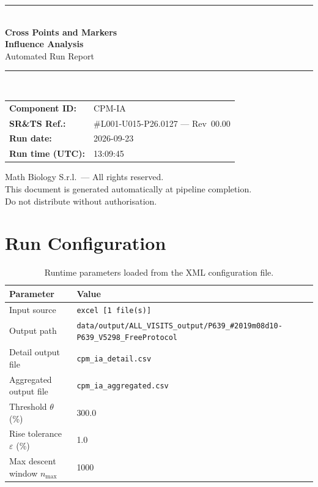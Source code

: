 \documentclass[a4paper,11pt]{article}
\begin{document}
\begin{titlepage}
\begin{center}
  \vspace*{1.8cm}
  {\color{dmaaccent}\rule{\linewidth}{1.5pt}}\\[0.6cm]
  {\LARGE\bfseries\color{dmaaccent}
    Cross Points and Markers\\[0.25cm]
    Influence Analysis}\\[0.4cm]
  {\Large Automated Run Report}\\[0.3cm]
  {\color{dmaaccent}\rule{\linewidth}{1.5pt}}\\[2cm]

  \begin{tabular}{ll}
    \textbf{Component ID:}   & CPM-IA \\[0.3cm]
    \textbf{SR\&TS Ref.:}    & \#L001-U015-P26.0127 --- Rev~00.00 \\[0.3cm]
    \textbf{Run date:}       & 2026-09-23 \\[0.3cm]
    \textbf{Run time (UTC):} & 13:09:45 \\
  \end{tabular}

  \vfill
  {\color{dmagray}\small
    Math Biology S.r.l.\ --- All rights reserved.\\
    This document is generated automatically at pipeline completion.\\
    Do not distribute without authorisation.}
\end{center}
\end{titlepage}

\tableofcontents
\clearpage

\section{Run Configuration}

\begin{table}[h!]
\centering
\small
\caption{Runtime parameters loaded from the XML configuration file.}
\begin{tabular}{ll}
\toprule
\textbf{Parameter} & \textbf{Value} \\
\midrule
Input source                      & \texttt{excel [1 file(s)]} \\
Output path                       & \texttt{data/output/ALL\_VISITS\_output/P639\_\#2019m08d10-P639\_V5298\_FreeProtocol} \\
Detail output file                & \texttt{cpm\_ia\_detail.csv} \\
Aggregated output file            & \texttt{cpm\_ia\_aggregated.csv} \\
Threshold $\theta$ (\%)           & 300.0 \\
Rise tolerance $\varepsilon$ (\%) & 1.0 \\
Max descent window $n_{\max}$     & 1000 \\
\bottomrule
\end{tabular}
\end{table}
\end{document}
